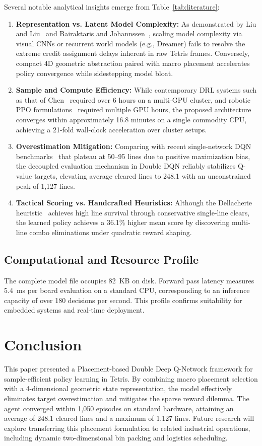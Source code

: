 \documentclass[runningheads]{llncs}
\begin{document}
Several notable analytical insights emerge from Table~\ref{tab:literature}:
\begin{enumerate}
    \item \textbf{Representation vs. Latent Model Complexity:} As demonstrated by Liu and Liu~\cite{liu2020learn} and Bairaktaris and Johannssen~\cite{bairaktaris2025outsmarting}, scaling model complexity via visual CNNs or recurrent world models (e.g., Dreamer) fails to resolve the extreme credit assignment delays inherent in raw Tetris frames. Conversely, compact 4D geometric abstraction paired with macro placement accelerates policy convergence while sidestepping model bloat.
    \item \textbf{Sample and Compute Efficiency:} While contemporary DRL systems such as that of Chen~\cite{chen2021playing} required over 6 hours on a multi-GPU cluster, and robotic PPO formulations~\cite{yan2022deep} required multiple GPU hours, the proposed architecture converges within approximately 16.8 minutes on a single commodity CPU, achieving a 21-fold wall-clock acceleration over cluster setups.
    \item \textbf{Overestimation Mitigation:} Comparing with recent single-network DQN benchmarks~\cite{tetris2024training} that plateau at 50--95 lines due to positive maximization bias, the decoupled evaluation mechanism in Double DQN reliably stabilizes Q-value targets, elevating average cleared lines to 248.1 with an unconstrained peak of 1,127 lines.
    \item \textbf{Tactical Scoring vs. Handcrafted Heuristics:} Although the Dellacherie heuristic~\cite{fahey2003tetris} achieves high line survival through conservative single-line clears, the learned policy achieves a 36.1\% higher mean score by discovering multi-line combo eliminations under quadratic reward shaping.
\end{enumerate}

\subsection{Computational and Resource Profile}
The complete model file occupies 82~KB on disk. Forward pass latency measures 5.4~ms per board evaluation on a standard CPU, corresponding to an inference capacity of over 180 decisions per second. This profile confirms suitability for embedded systems and real-time deployment.

\section{Conclusion}
This paper presented a Placement-based Double Deep Q-Network framework for sample-efficient policy learning in Tetris. By combining macro placement selection with a 4-dimensional geometric state representation, the model effectively eliminates target overestimation and mitigates the sparse reward dilemma. The agent converged within 1,050 episodes on standard hardware, attaining an average of 248.1 cleared lines and a maximum of 1,127 lines. Future research will explore transferring this placement formulation to related industrial operations, including dynamic two-dimensional bin packing and logistics scheduling.
\end{document}
